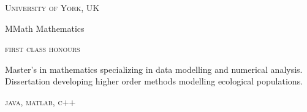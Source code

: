 \textsc{\small{University of York, UK
}}

{\raggedright\large {
    MMath Mathematics
} \\}

\textsc{\small{first class honours}}

\normalsize{
    Master's in mathematics specializing in data modelling and numerical analysis. Dissertation developing higher order methods modelling ecological populations.
}

\textsc{\small{\color{highlight}
    java, matlab, c++
}}\\
